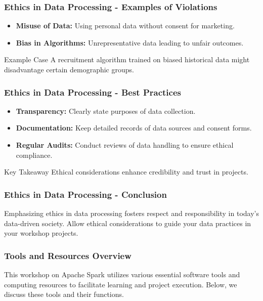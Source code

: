 \documentclass[aspectratio=169]{beamer}
\begin{document}
\begin{frame}[fragile]
    \frametitle{Ethics in Data Processing - Examples of Violations}
    \begin{itemize}
        \item \textbf{Misuse of Data:} Using personal data without consent for marketing.
        \item \textbf{Bias in Algorithms:} Unrepresentative data leading to unfair outcomes.
    \end{itemize}
    \begin{block}{Example Case}
        A recruitment algorithm trained on biased historical data might disadvantage certain demographic groups.
    \end{block}
\end{frame}

\begin{frame}[fragile]
    \frametitle{Ethics in Data Processing - Best Practices}
    \begin{itemize}
        \item \textbf{Transparency:} Clearly state purposes of data collection.
        \item \textbf{Documentation:} Keep detailed records of data sources and consent forms.
        \item \textbf{Regular Audits:} Conduct reviews of data handling to ensure ethical compliance.
    \end{itemize}
    \begin{block}{Key Takeaway}
        Ethical considerations enhance credibility and trust in projects.
    \end{block}
\end{frame}

\begin{frame}[fragile]
    \frametitle{Ethics in Data Processing - Conclusion}
    Emphasizing ethics in data processing fosters respect and responsibility in today's data-driven society. Allow ethical considerations to guide your data practices in your workshop projects.
\end{frame}

\begin{frame}[fragile]
    \frametitle{Tools and Resources Overview}
    This workshop on Apache Spark utilizes various essential software tools and computing resources 
    to facilitate learning and project execution. Below, we discuss these tools and their functions.
\end{frame}
\end{document}
